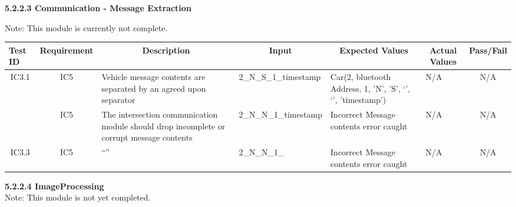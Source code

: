 \documentclass [10pt]{article}
\begin{document}
     \textbf{5.2.2.3 Communication - Message Extraction} 
     
     Note: This module is currently not complete.\\
     
 \begin{longtable}{ | p{ } | p{ } |  p{ } |  p{ } | p{ } | p{ } |  p{ } |}  \hline

    \rowcolor{subsectionC}\textbf{Test ID}
    & \multicolumn{1}{c|}{\textbf{Requirement} }
    &\multicolumn{1}{c|}{\textbf{Description} }
    & \multicolumn{1}{c|}{\textbf{Input} }
    & \multicolumn{1}{c|}{\textbf{Expected Values} }
    & \multicolumn{1}{c|}{\textbf{Actual Values} }
    & \multicolumn{1}{c|}{\textbf{Pass/Fail}} \\  \hline
    
       \multicolumn{1}{|c|}{IC3.1} 
    & \multicolumn{1}{c|}{IC5}
    &Vehicle message contents are separated by an agreed upon separator
    & 2\_N\_S\_1\_timestamp
    & Car(2, bluetooth Address, 1, 'N', 'S', `', `', 'timestamp') 
    &  N/A
    & \multicolumn{1}{c|}{N/A}\\\hline
    
    
    \rowcolor{tableCell}\multicolumn{1}{|c|}{IC3.2} 
    & \multicolumn{1}{c|}{IC5} 
    &The intersection communication module should drop incomplete or corrupt message contents
    & 2\_N\_N\_1\_timestamp
    & Incorrect Message contents error caught
    &  N/A
    & \multicolumn{1}{c|}{N/A}\\\hline
    
    \multicolumn{1}{|c|}{IC3.3} 
    & \multicolumn{1}{c|}{IC5} 
    & ``''
    & 2\_N\_N\_1\_
    & Incorrect Message contents error caught
    &  N/A
    & \multicolumn{1}{c|}{N/A}\\ \hline
    
    \end{longtable}
    
    
    \textbf{5.2.2.4 ImageProcessing} \vspace{2mm}\\
    Note: This module is not yet completed. 
    
\end{document}
